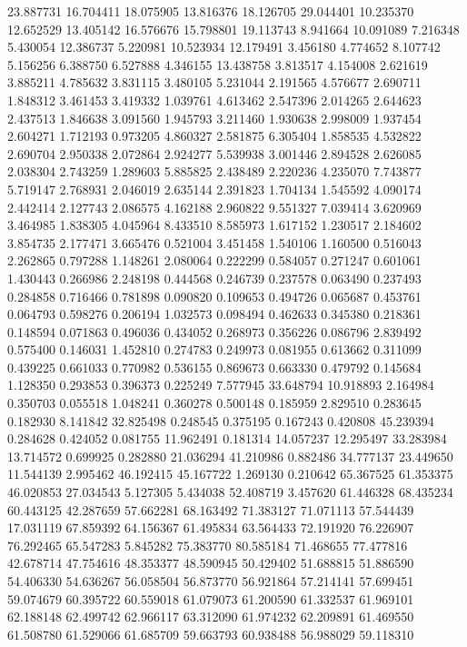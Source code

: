 23.887731
16.704411
18.075905
13.816376
18.126705
29.044401
10.235370
12.652529
13.405142
16.576676
15.798801
19.113743
8.941664
10.091089
7.216348
5.430054
12.386737
5.220981
10.523934
12.179491
3.456180
4.774652
8.107742
5.156256
6.388750
6.527888
4.346155
13.438758
3.813517
4.154008
2.621619
3.885211
4.785632
3.831115
3.480105
5.231044
2.191565
4.576677
2.690711
1.848312
3.461453
3.419332
1.039761
4.613462
2.547396
2.014265
2.644623
2.437513
1.846638
3.091560
1.945793
3.211460
1.930638
2.998009
1.937454
2.604271
1.712193
0.973205
4.860327
2.581875
6.305404
1.858535
4.532822
2.690704
2.950338
2.072864
2.924277
5.539938
3.001446
2.894528
2.626085
2.038304
2.743259
1.289603
5.885825
2.438489
2.220236
4.235070
7.743877
5.719147
2.768931
2.046019
2.635144
2.391823
1.704134
1.545592
4.090174
2.442414
2.127743
2.086575
4.162188
2.960822
9.551327
7.039414
3.620969
3.464985
1.838305
4.045964
8.433510
8.585973
1.617152
1.230517
2.184602
3.854735
2.177471
3.665476
0.521004
3.451458
1.540106
1.160500
0.516043
2.262865
0.797288
1.148261
2.080064
0.222299
0.584057
0.271247
0.601061
1.430443
0.266986
2.248198
0.444568
0.246739
0.237578
0.063490
0.237493
0.284858
0.716466
0.781898
0.090820
0.109653
0.494726
0.065687
0.453761
0.064793
0.598276
0.206194
1.032573
0.098494
0.462633
0.345380
0.218361
0.148594
0.071863
0.496036
0.434052
0.268973
0.356226
0.086796
2.839492
0.575400
0.146031
1.452810
0.274783
0.249973
0.081955
0.613662
0.311099
0.439225
0.661033
0.770982
0.536155
0.869673
0.663330
0.479792
0.145684
1.128350
0.293853
0.396373
0.225249
7.577945
33.648794
10.918893
2.164984
0.350703
0.055518
1.048241
0.360278
0.500148
0.185959
2.829510
0.283645
0.182930
8.141842
32.825498
0.248545
0.375195
0.167243
0.420808
45.239394
0.284628
0.424052
0.081755
11.962491
0.181314
14.057237
12.295497
33.283984
13.714572
0.699925
0.282880
21.036294
41.210986
0.882486
34.777137
23.449650
11.544139
2.995462
46.192415
45.167722
1.269130
0.210642
65.367525
61.353375
46.020853
27.034543
5.127305
5.434038
52.408719
3.457620
61.446328
68.435234
60.443125
42.287659
57.662281
68.163492
71.383127
71.071113
57.544439
17.031119
67.859392
64.156367
61.495834
63.564433
72.191920
76.226907
76.292465
65.547283
5.845282
75.383770
80.585184
71.468655
77.477816
42.678714
47.754616
48.353377
48.590945
50.429402
51.688815
51.886590
54.406330
54.636267
56.058504
56.873770
56.921864
57.214141
57.699451
59.074679
60.395722
60.559018
61.079073
61.200590
61.332537
61.969101
62.188148
62.499742
62.966117
63.312090
61.974232
62.209891
61.469550
61.508780
61.529066
61.685709
59.663793
60.938488
56.988029
59.118310
